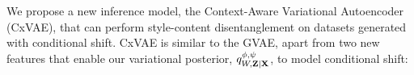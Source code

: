 \documentclass[../thesis.tex]{subfiles}
\begin{document}

We propose a new inference model, the Context-Aware Variational Autoencoder (CxVAE), that can perform style-content disentanglement on datasets generated with conditional shift. CxVAE is similar to the GVAE, apart from two new features that enable our variational posterior, $\myfunc{q}^{\phi, \psi}_{\myrv{w}, \mygroup{\myrv{z}} | \mygroup{\myrv{x}}}$, to model conditional shift: 

\end{document}
